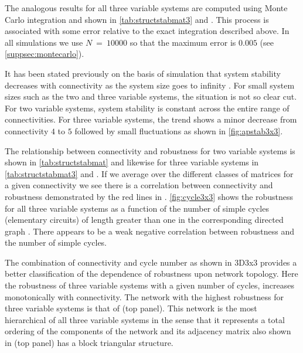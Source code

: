 The analogous results for all three variable systems are computed using Monte Carlo integration and shown in \ref{tab:structstabmat3} and . This process is associated with some error relative to the exact integration described above. In all simulations we use $N~=~10000$ so that the maximum error is $0.005$ (see \ref{suppsec:montecarlo}).

It has been stated previously on the basis of simulation that system stability decreases with connectivity as the system size goes to infinity \cite{May1972}. For small system sizes such as the two and three variable systems, the situation is not so clear cut. For two variable systems, system stability is constant across the entire range of connectivities. For three variable systems, the trend shows a minor decrease from connectivity $4$ to $5$ followed by small fluctuations as shown in \ref{fig:apstab3x3}.

The relationship between connectivity and robustness for two variable systems is shown in \ref{tab:structstabmat} and likewise for three variable systems in \ref{tab:structstabmat3} and . If we average over the different classes of matrices for a given connectivity we see there is a correlation between connectivity and robustness demonstrated by the red lines in .
\ref{fig:cycle3x3} shows the robustness for all three variable systems as a function of the number of simple cycles (elementary circuits) of length greater than one in the corresponding directed graph \cite{Johnson1975}. There appears to be a weak negative correlation between robustness and the number of simple cycles.

The combination of connectivity and cycle number as shown in 3D3x3 provides a better classification of the dependence of robustness upon network topology. Here the robustness of three variable systems with a given number of cycles, increases monotonically with connectivity. The network with the highest robustness for three variable systems is that of  (top panel). This network is the most hierarchical of all three variable systems in the sense that it represents a total ordering of the components of the network and its adjacency matrix also shown in  (top panel) has a block triangular structure.

